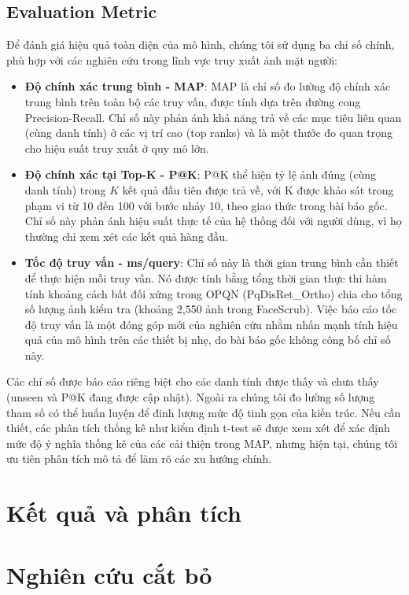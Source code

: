 \subsection{Evaluation Metric}
Để đánh giá hiệu quả toàn diện của mô hình, chúng tôi sử dụng ba chỉ số chính, phù hợp với các nghiên cứu trong lĩnh vực truy xuất ảnh mặt người:
\begin{itemize}
    \item \textbf{Độ chính xác trung bình - MAP}: MAP là chỉ số đo lường độ chính xác trung bình trên toàn bộ các truy vấn, được tính dựa trên đường cong Precision-Recall. Chỉ số này phản ánh khả năng trả về các mục tiêu liên quan (cùng danh tính) ở các vị trí cao (top ranks) và là một thước đo quan trọng cho hiệu suất truy xuất ở quy mô lớn.
    \item \textbf{Độ chính xác tại Top-K - P@K}: P@K thể hiện tỷ lệ ảnh đúng (cùng danh tính) trong $K$ kết quả đầu tiên được trả về, với K được khảo sát trong phạm vi từ 10 đến 100 với bước nhảy 10, theo giao thức trong bài báo gốc. Chỉ số này phản ánh hiệu suất thực tế của hệ thống đối với người dùng, vì họ thường chỉ xem xét các kết quả hàng đầu.
    \item \textbf{Tốc độ truy vấn - ms/query}: Chỉ số này là thời gian trung bình cần thiết để thực hiện mỗi truy vấn. Nó được tính bằng tổng thời gian thực thi hàm tính khoảng cách bất đối xứng trong OPQN (PqDisRet\_Ortho) chia cho tổng số lượng ảnh kiểm tra (khoảng 2,550 ảnh trong FaceScrub). Việc báo cáo tốc độ truy vấn là một đóng góp mới của nghiên cứu nhằm nhấn mạnh tính hiệu quả của mô hình trên các thiết bị nhẹ, do bài báo gốc không công bố chỉ số này.
\end{itemize}

Các chỉ số được báo cáo riêng biệt cho các danh tính được thấy và chưa thấy (unseen và P@K đang được cập nhật). Ngoài ra chúng tôi đo lường số lượng tham số có thể huấn luyện để đinh lượng mức độ tinh gọn của kiến trúc. Nếu cần thiết, các phân tích thống kê như kiểm định t-test sẽ được xem xét để xác định mức độ ý nghĩa thống kê của các cải thiện trong MAP, nhưng hiện tại, chúng tôi ưu tiên phân tích mô tả để làm rõ các xu hướng chính.

\section {Kết quả và phân tích}

\section {Nghiên cứu cắt bỏ}